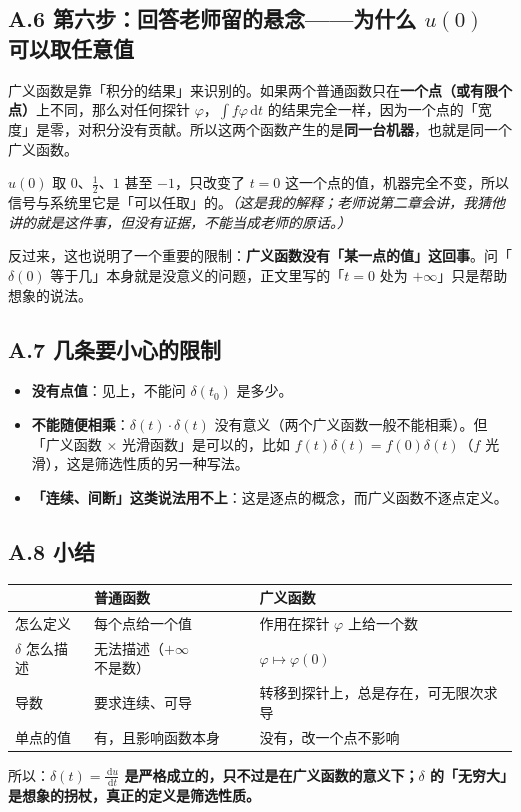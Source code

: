 \documentclass[UTF8,a4paper,11pt]{ctexart}
\renewcommand{\d}{\,\mathrm{d}}
\begin{document}
\subsection*{A.6 第六步：回答老师留的悬念——为什么 $u(0)$ 可以取任意值}
广义函数是靠「积分的结果」来识别的。如果两个普通函数只在\textbf{一个点（或有限个点）}上不同，那么对任何探针 $\varphi$，$\int f\varphi\d t$ 的结果完全一样，因为一个点的「宽度」是零，对积分没有贡献。所以这两个函数产生的是\textbf{同一台机器}，也就是同一个广义函数。

$u(0)$ 取 $0$、$\tfrac12$、$1$ 甚至 $-1$，只改变了 $t=0$ 这一个点的值，机器完全不变，所以信号与系统里它是「可以任取」的。\emph{（这是我的解释；老师说第二章会讲，我猜他讲的就是这件事，但没有证据，不能当成老师的原话。）}

反过来，这也说明了一个重要的限制：\textbf{广义函数没有「某一点的值」这回事}。问「$\delta(0)$ 等于几」本身就是没意义的问题，正文里写的「$t=0$ 处为 $+\infty$」只是帮助想象的说法。

\subsection*{A.7 几条要小心的限制}
\begin{itemize}
\item \textbf{没有点值}：见上，不能问 $\delta(t_0)$ 是多少。
\item \textbf{不能随便相乘}：$\delta(t)\cdot\delta(t)$ 没有意义（两个广义函数一般不能相乘）。但「广义函数 $\times$ 光滑函数」是可以的，比如 $f(t)\delta(t)=f(0)\delta(t)$（$f$ 光滑），这是筛选性质的另一种写法。
\item \textbf{「连续、间断」这类说法用不上}：这是逐点的概念，而广义函数不逐点定义。
\end{itemize}

\subsection*{A.8 小结}
\begin{center}
\begin{tabular}{p{}p{}p{}}
\toprule
 & 普通函数 & 广义函数 \\
\midrule
怎么定义 & 每个点给一个值 & 作用在探针 $\varphi$ 上给一个数 \\
$\delta$ 怎么描述 & 无法描述（$+\infty$ 不是数） & $\varphi\mapsto\varphi(0)$ \\
导数 & 要求连续、可导 & 转移到探针上，总是存在，可无限次求导 \\
单点的值 & 有，且影响函数本身 & 没有，改一个点不影响 \\
\bottomrule
\end{tabular}
\end{center}
所以：\textbf{$\delta(t)=\frac{\d u}{\d t}$ 是严格成立的，只不过是在广义函数的意义下；$\delta$ 的「无穷大」是想象的拐杖，真正的定义是筛选性质。}
\end{document}
